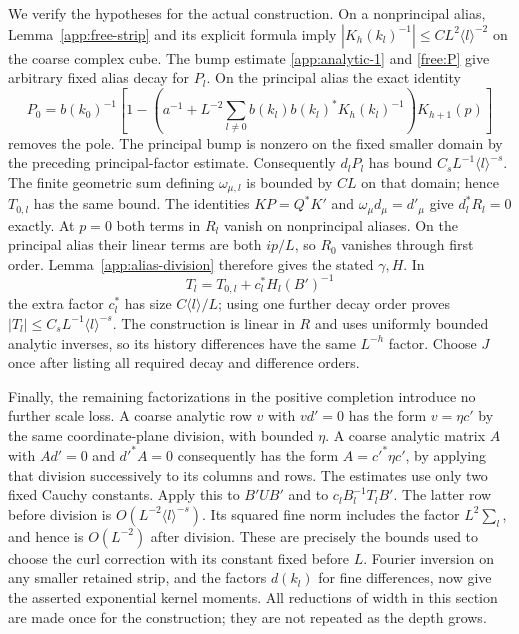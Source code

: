 We verify the hypotheses for the actual construction.  On a
nonprincipal alias, Lemma~\ref{app:free-strip} and its explicit
formula imply
$|K_h(k_l)^{-1}|\le CL^2\langle l\rangle^{-2}$
on the coarse complex cube.  The bump estimate \eqref{app:analytic-1} and
\eqref{free:P} give arbitrary fixed alias decay for $P_l$.
On the principal alias the exact identity
\[
 P_0=b(k_0)^{-1}\left[1-
 \left(a^{-1}+L^{-2}\sum_{l\ne0}b(k_l)b(k_l)^*K_h(k_l)^{-1}
 \right)K_{h+1}(p)\right]
\]
removes the pole.  The principal bump is nonzero on the fixed
smaller domain by the preceding principal-factor estimate.
Consequently $d_lP_l$ has bound
$C_sL^{-1}\langle l\rangle^{-s}$.
The finite geometric sum defining $\omega_{\mu,l}$ is bounded
by $CL$ on that domain; hence $T_{0,l}$ has the same bound.
The identities $KP=Q^*K'$ and $\omega_\mu d_\mu=d'_\mu$
give $d_l^*R_l=0$ exactly.  At $p=0$ both terms in $R_l$ vanish
on nonprincipal aliases.  On the principal alias their linear
terms are both $ip/L$, so $R_0$ vanishes through first order.
Lemma~\ref{app:alias-division} therefore gives the stated $\gamma,H$.
In
\[
 T_l=T_{0,l}+c_l^*H_l(B')^{-1}
\]
the extra factor $c_l^*$ has size $C\langle l\rangle/L$;
using one further decay order proves
$|T_l|\le C_sL^{-1}\langle l\rangle^{-s}$.
The construction is linear in $R$ and uses uniformly bounded analytic
inverses, so its history differences have the same $L^{-h}$ factor.
Choose $J$ once after listing all required decay and difference orders.

Finally, the remaining factorizations in the positive completion
introduce no further scale loss.  A coarse analytic row $v$ with
$vd'=0$ has the form $v=\eta c'$ by the same coordinate-plane
division, with bounded $\eta$.  A coarse analytic matrix $A$ with
$Ad'=0$ and $d'^*A=0$ consequently has the form
$A=c'^*\eta c'$, by applying that division successively to its
columns and rows.  The estimates use only two fixed Cauchy constants.
Apply this to $B'UB'$ and to $c_lB_l^{-1}T_lB'$.
The latter row before division is
$O(L^{-2}\langle l\rangle^{-s})$.
Its squared fine norm includes the factor $L^2\sum_l$, and hence
is $O(L^{-2})$ after division.  These are precisely the bounds used
to choose the curl correction with its constant fixed before $L$.
Fourier inversion on any smaller retained strip, and the factors
$d(k_l)$ for fine differences, now give the asserted exponential
kernel moments.  All reductions of width in this section are made
once for the construction; they are not repeated as the depth grows.
